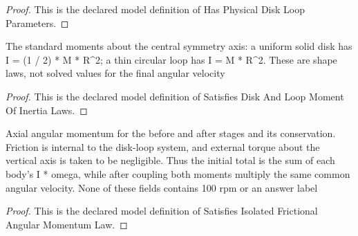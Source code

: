 \begin{proof}
  This is the declared model definition of Has Physical Disk Loop Parameters.
\end{proof}
\begin{definition}
  \label{def:physics:phyx-mini-0712:phyxminiproblems-problemphyxmini0712-satisfiesdiskandloopmomentofinertialaws}
  The standard moments about the central symmetry axis: a uniform solid disk has I = (1 / 2) * M * R\textasciicircum{}2; a thin circular loop has I = M * R\textasciicircum{}2. These are shape laws, not solved values for the final angular velocity
\end{definition}
\begin{proof}
  This is the declared model definition of Satisfies Disk And Loop Moment Of Inertia Laws.
\end{proof}
\begin{definition}
  \label{def:physics:phyx-mini-0712:phyxminiproblems-problemphyxmini0712-satisfiesisolatedfrictionalangularmomentumlaw}
  Axial angular momentum for the before and after stages and its conservation. Friction is internal to the disk-loop system, and external torque about the vertical axis is taken to be negligible. Thus the initial total is the sum of each body's I * omega, while after coupling both moments multiply the same common angular velocity. None of these fields contains 100 rpm or an answer label
\end{definition}
\begin{proof}
  This is the declared model definition of Satisfies Isolated Frictional Angular Momentum Law.
\end{proof}
